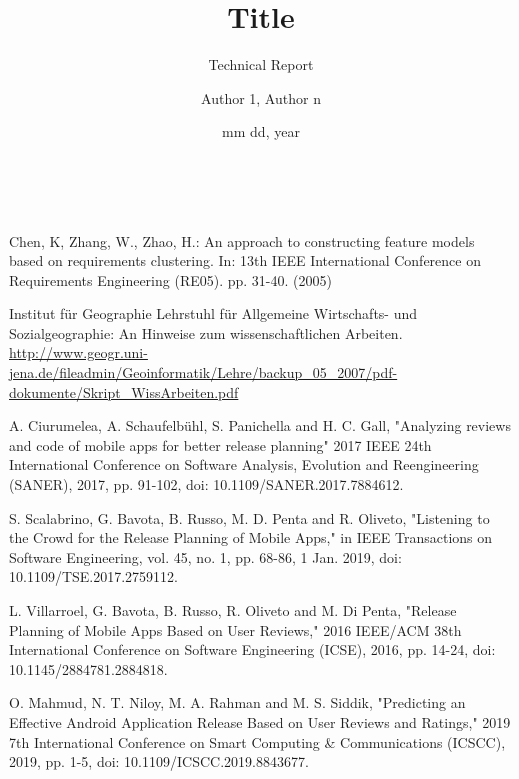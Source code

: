 \documentclass[a4paper,10pt, bibliography=totocnumbered]{scrreprt}
\author{Author 1, Author n}
\title{Title }
\subtitle{Technical Report}
\date{mm dd, year}
\makeatletter
\renewcommand{\maketitle}{\begin{titlepage}
    \vskip 10\p@
    \hbox{
      \vrule depth 0.99\textheight
        \mbox{\hspace{2em}}
      \vtop{
        \vskip 10\p@
        \hspace{4pt}
        \vskip 50\p@
        \begin{flushleft}
          \Large \@author \par
        \end{flushleft}
        \vskip 50\p@
        \begin{flushleft}
          \huge \bfseries \@title \par
        \end{flushleft}
        \begin{flushleft}
          \Large \bfseries \@subtitle \par
        \end{flushleft}
        \vskip 70\p@
        \begin{flushleft}
          \Large \@publishers \par
        \end{flushleft}
        \vskip 50\p@
        \begin{flushleft}
          \Large \@date \par
        \end{flushleft}
        }}
  \end{titlepage}
}
\makeatother
\begin{document}
\maketitle



\tableofcontents









\begin{thebibliography}{9}

 Chen, K, Zhang, W., Zhao, H.: An approach to constructing feature models based on requirements clustering.
In: 13th IEEE International Conference on Requirements Engineering (RE05). pp. 31-40. (2005)

 Institut für Geographie   
Lehrstuhl für Allgemeine Wirtschafts- und Sozialgeographie: An Hinweise zum wissenschaftlichen Arbeiten.
\url{http://www.geogr.uni-jena.de/fileadmin/Geoinformatik/Lehre/backup_05_2007/pdf-dokumente/Skript_WissArbeiten.pdf}

 A. Ciurumelea, A. Schaufelbühl, S. Panichella and H. C. Gall, "Analyzing reviews and code of mobile apps for better release planning" 2017 IEEE 24th International Conference on Software Analysis, Evolution and Reengineering (SANER), 2017, pp. 91-102, doi: 10.1109/SANER.2017.7884612.
  
 S. Scalabrino, G. Bavota, B. Russo, M. D. Penta and R. Oliveto, "Listening to the Crowd for the Release Planning of Mobile Apps," in IEEE Transactions on Software Engineering, vol. 45, no. 1, pp. 68-86, 1 Jan. 2019, doi: 10.1109/TSE.2017.2759112.

L. Villarroel, G. Bavota, B. Russo, R. Oliveto and M. Di Penta, "Release Planning of Mobile Apps Based on User Reviews," 2016 IEEE/ACM 38th International Conference on Software Engineering (ICSE), 2016, pp. 14-24, doi: 10.1145/2884781.2884818.
  
O. Mahmud, N. T. Niloy, M. A. Rahman and M. S. Siddik, "Predicting an Effective Android Application Release Based on User Reviews and Ratings," 2019 7th International Conference on Smart Computing \& Communications (ICSCC), 2019, pp. 1-5, doi: 10.1109/ICSCC.2019.8843677.


\end{thebibliography}
\end{document}

